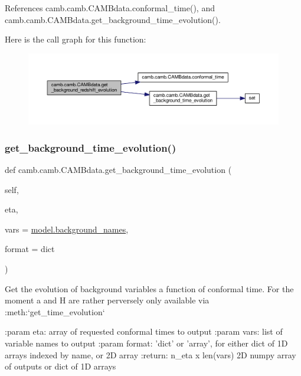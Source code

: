 References camb.\+camb.\+C\+A\+M\+Bdata.\+conformal\+\_\+time(), and camb.\+camb.\+C\+A\+M\+Bdata.\+get\+\_\+background\+\_\+time\+\_\+evolution().

Here is the call graph for this function\+:
\nopagebreak
\begin{figure}[H]
\begin{center}
\leavevmode
\includegraphics[width=350pt]{classcamb_1_1camb_1_1CAMBdata_a29f3b8fde294834832ea19680e254d31_cgraph}
\end{center}
\end{figure}
\mbox{\label{classcamb_1_1camb_1_1CAMBdata_a07e53d4b201c37fd204545577717b42b}} 
\subsubsection{\texorpdfstring{get\+\_\+background\+\_\+time\+\_\+evolution()}{get\_background\_time\_evolution()}}
{\footnotesize\ttfamily def camb.\+camb.\+C\+A\+M\+Bdata.\+get\+\_\+background\+\_\+time\+\_\+evolution (\begin{DoxyParamCaption}\item[{}]{self,  }\item[{}]{eta,  }\item[{}]{vars = {\ttfamily \mbox{\hyperlink{namespacecamb_1_1model_ad21210b2a1480586c2da0e821e0f5dfb}{model.\+background\+\_\+names}}},  }\item[{}]{format = {\ttfamily \textquotesingle{}dict\textquotesingle{}} }\end{DoxyParamCaption})}

\begin{DoxyVerb}Get the evolution of background variables a function of conformal time.
For the moment a and H are rather perversely only available via :meth:`get_time_evolution`

:param eta: array of requested conformal times to output
:param vars: list of variable names to output
:param format: 'dict' or 'array', for either dict of 1D arrays indexed by name, or 2D array
:return: n_eta x len(vars) 2D numpy array of outputs or dict of 1D arrays
\end{DoxyVerb}
 

